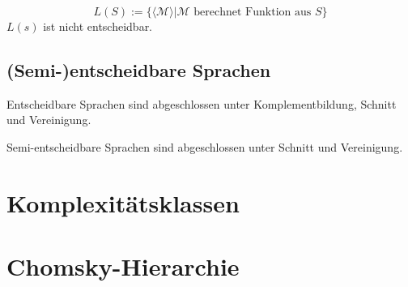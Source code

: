 \vspace*{-4mm}
\[ L(S) := \{ \langle\mathcal{M}\rangle | \mathcal{M} \text{ berechnet Funktion aus } S \} \]
$L(s)$ ist nicht entscheidbar.

\subsection*{(Semi-)entscheidbare Sprachen}

Entscheidbare Sprachen sind abgeschlossen unter Komplementbildung, Schnitt und Vereinigung.

\spacing

Semi-entscheidbare Sprachen sind abgeschlossen unter Schnitt und Vereinigung.

\section*{Komplexitätsklassen}

\section*{Chomsky-Hierarchie}
